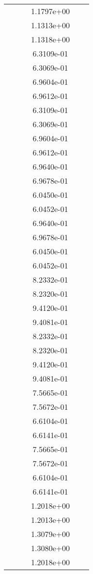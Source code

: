 \begin{xltabular}{\textwidth}{r|rS[table-format=1.3e+2]S[table-format=1.4e+2]S[table-format=1.4e+2]S[table-format=-1.5]}
&  &  & 1.1797e+00 & & \\
&  &  & 1.1313e+00 & & \\
&  &  & 1.1318e+00 & & \\
&  &  & 6.3109e-01 & & \\
&  &  & 6.3069e-01 & & \\
&  &  & 6.9604e-01 & & \\
&  &  & 6.9612e-01 & & \\
&  &  & 6.3109e-01 & & \\
&  &  & 6.3069e-01 & & \\
&  &  & 6.9604e-01 & & \\
&  &  & 6.9612e-01 & & \\
&  &  & 6.9640e-01 & & \\
&  &  & 6.9678e-01 & & \\
&  &  & 6.0450e-01 & & \\
&  &  & 6.0452e-01 & & \\
&  &  & 6.9640e-01 & & \\
&  &  & 6.9678e-01 & & \\
&  &  & 6.0450e-01 & & \\
&  &  & 6.0452e-01 & & \\
&  &  & 8.2332e-01 & & \\
&  &  & 8.2320e-01 & & \\
&  &  & 9.4120e-01 & & \\
&  &  & 9.4081e-01 & & \\
&  &  & 8.2332e-01 & & \\
&  &  & 8.2320e-01 & & \\
&  &  & 9.4120e-01 & & \\
&  &  & 9.4081e-01 & & \\
&  &  & 7.5665e-01 & & \\
&  &  & 7.5672e-01 & & \\
&  &  & 6.6104e-01 & & \\
&  &  & 6.6141e-01 & & \\
&  &  & 7.5665e-01 & & \\
&  &  & 7.5672e-01 & & \\
&  &  & 6.6104e-01 & & \\
&  &  & 6.6141e-01 & & \\
&  &  & 1.2018e+00 & & \\
&  &  & 1.2013e+00 & & \\
&  &  & 1.3079e+00 & & \\
&  &  & 1.3080e+00 & & \\
&  &  & 1.2018e+00 & & \\

\end{xltabular}
